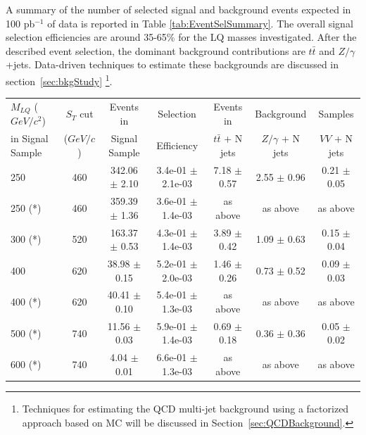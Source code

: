 A summary of the number of selected signal and background events expected in 100 pb$^{-1}$ of data 
is reported in Table \ref{tab:EventSelSummary}. 
The overall signal selection efficiencies are around 35-65\% for the LQ masses investigated. 
After the described event selection, the dominant background contributions 
are $t\bar{t}$ and $Z/\gamma$+jets. Data-driven techniques to estimate these backgrounds
are discussed in section~\ref{sec:bkgStudy} \footnote{Techniques for estimating the QCD multi-jet background using 
a factorized approach based on MC will be discussed in Section~\ref{sec:QCDBackground}.}.

\begin{table}[htbp]
\begin{center} \small
\begin{tabular}{|lccc||ccc|}
\hline\hline
$M_{LQ}$ ($GeV/c^2$)      & $S_T$ cut       & Events in           & Selection           & Events in           & Background          & Samples     \\
in Signal Sample          & ($GeV/c$)       & Signal Sample       & Efficiency          & $t\bar{t}$ + N jets & $Z/\gamma$ + N jets &  $VV$ + N jets \\
\hline
250                       & 460             & 342.06 $\pm$ 2.10   &3.4e-01 $\pm$ 2.1e-03  & 7.18  $\pm$ 0.57    & 2.55  $\pm$ 0.96    & 0.21 $\pm$ 0.05 \\
250 (*)                   & 460             & 359.39 $\pm$ 1.36   &3.6e-01 $\pm$ 1.4e-03   & as above            & as above            &  as above        \\
300 (*)                   & 520             & 163.37 $\pm$ 0.53  &4.3e-01 $\pm$ 1.4e-03  & 3.89  $\pm$ 0.42    & 1.09  $\pm$ 0.63    &  0.15 $\pm$ 0.04 \\
400                       & 620             &  38.98 $\pm$ 0.15  &5.2e-01 $\pm$ 2.0e-03  & 1.46  $\pm$ 0.26    & 0.73  $\pm$ 0.52    &  0.09 $\pm$ 0.03 \\
400 (*)                   & 620             &  40.41 $\pm$ 0.10  &5.4e-01 $\pm$ 1.3e-03  & as above            & as above            &  as above        \\
500 (*)                   & 740             &  11.56 $\pm$ 0.03  &5.9e-01 $\pm$ 1.4e-03  & 0.69  $\pm$ 0.18    & 0.36  $\pm$ 0.36    &  0.05 $\pm$ 0.02 \\
600 (*)                   & 740             &   4.04 $\pm$ 0.01  &6.6e-01 $\pm$ 1.3e-03  & as above            & as above            &  as above        \\

\end{tabular}
\end{center}
\end{table}
